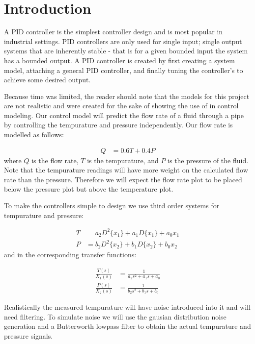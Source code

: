\documentclass[main.tex]{subfile}
\begin{document}
\section{Introduction} 
\label{sec:introduction}

A PID controller is the simplest controller design and is most popular in
industrial settings. PID controllers are only used for single input; single
output systems that are inherently stable - that is for a given bounded input the
system has a bounded output. A PID controller is created by first creating a
system model, attaching a general PID controller, and finally tuning the
controller's to achieve some desired output. 

Because time was limited, the reader should note that the models for this
project are not realistic and were created for the sake of showing the use of
\Labview in control modeling. Our control model will predict the flow rate of a
fluid through a pipe by controlling the tempurature and pressure independently.
Our flow rate is modelled as follows: 

\begin{align}
	Q &= 0.6T+0.4P \label{eq:flowRate}
\end{align}
where $Q$ is the flow rate, $T$ is the tempurature, and $P$ is the pressure of
the fluid. Note that the tempurature readings will have more weight on the
calculated flow rate than the pressure. Therefore we will expect the flow rate
plot to be placed below the pressure plot but above the temperature plot.

To make the controllers simple to design we use third order systems for
tempurature and pressure:

\begin{align}
	T &= a_2D^2\{x_1\} + a_1D\{x_1\} + a_0x_1
	\\P &= b_2D^2\{x_2\} + b_1D\{x_2\} + b_0x_2
\end{align}
and in the corresponding transfer functions:

\begin{align}
	\frac{T(s)}{X_1(s)} &= \frac{1}{a_2s^2+a_1s+a_0}
	\\\frac{P(s)}{X_2(s)} &= \frac{1}{b_2s^2+b_1s+b_0}
\end{align}

Realistically the measured tempurature will have noise introduced into it and
will need filtering. To simulate noise we will use the gausian distribution
noise generation and a Butterworth lowpass filter to obtain the actual
tempurature and pressure signals.


\end{document}
